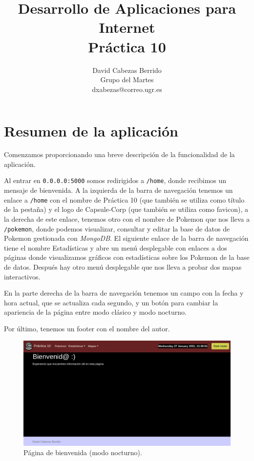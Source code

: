 \documentclass{article}
\title{\Huge Desarrollo de Aplicaciones para Internet \\ Práctica 10 \vspace{10mm}}
\author{\huge David Cabezas Berrido \vspace{10mm} \\ 
  \huge Grupo del Martes \vspace{10mm} \\ \huge dxabezas@correo.ugr.es \vspace{10mm}}
\begin{document}
\maketitle
\pagebreak
\tableofcontents
\pagebreak

\section{Resumen de la aplicación}
Comenzamos proporcionando una breve descripción de la funcionalidad de la aplicación.

Al entrar en \texttt{0.0.0.0:5000} somos redirigidos a \texttt{/home},
donde recibimos un mensaje de bienvenida. A la izquierda de la barra
de navegación tenemos un enlace a \texttt{/home} con el nombre de
Práctica 10 (que también se utiliza como título de la pestaña) y el
logo de Capsule-Corp (que también se utiliza como favicon), a la
derecha de este enlace, tenemos otro con el nombre de Pokemon que nos
lleva a \texttt{/pokemon}, donde podemos visualizar, consultar y
editar la base de datos de Pokemon gestionada con \textit{MongoDB}. El
siguiente enlace de la barra de navegación tiene el nombre
Estadísticas y abre un menú desplegable con enlaces a dos páginas
donde visualizamos gráficos con estadísticas sobre los Pokemon de la
base de datos. Después hay otro menú desplegable que nos lleva a
probar dos mapas interactivos.

En la parte derecha de la barra de navegación tenemos un campo con la
fecha y hora actual, que se actualiza cada segundo, y un botón para
cambiar la apariencia de la página entre modo clásico y modo nocturno.

Por último, tenemos un footer con el nombre del autor.

\begin{figure}[H]
  \centering
  \includegraphics[width=180mm]{imgs/home}
  \caption{Página de bienvenida (modo nocturno).}
  \label{fig:home}
\end{figure}
\end{document}
